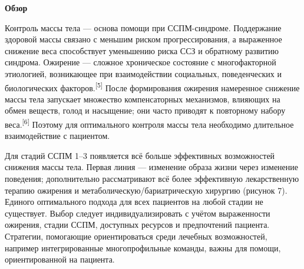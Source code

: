 \documentclass[11pt,a4paper]{article}
\newcommand{\src}[1]{\textsuperscript{[#1]}}
\newcommand{\heading}[1]{\par\medskip\textbf{#1}\par}
\begin{document}
\heading{Обзор}
Контроль массы тела --- основа помощи при ССПМ-синдроме. Поддержание здоровой массы связано с меньшим риском прогрессирования, а выраженное снижение веса способствует уменьшению риска ССЗ и обратному развитию синдрома. Ожирение --- сложное хроническое состояние с многофакторной этиологией, возникающее при взаимодействии социальных, поведенческих и биологических факторов.\src{5} После формирования ожирения намеренное снижение массы тела запускает множество компенсаторных механизмов, влияющих на обмен веществ, голод и насыщение; они часто приводят к повторному набору веса.\src{6} Поэтому для оптимального контроля массы тела необходимо длительное взаимодействие с пациентом.

Для стадий ССПМ 1--3 появляется всё больше эффективных возможностей снижения массы тела. Первая линия --- изменение образа жизни через изменение поведения; дополнительно рассматривают всё более эффективную лекарственную терапию ожирения и метаболическую/бариатрическую хирургию (рисунок 7). Единого оптимального подхода для всех пациентов на любой стадии не существует. Выбор следует индивидуализировать с учётом выраженности ожирения, стадии ССПМ, доступных ресурсов и предпочтений пациента. Стратегии, помогающие ориентироваться среди лечебных возможностей, например интегрированные многопрофильные команды, важны для помощи, ориентированной на пациента.
\end{document}

